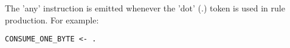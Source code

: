The 'any' instruction is emitted whenever the 'dot' (.) token is used
in rule production. For example:

\begin{myquote}
\begin{verbatim}
CONSUME_ONE_BYTE <- .
\end{verbatim}
\end{myquote}
